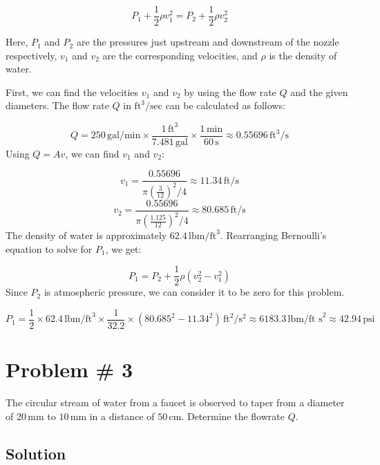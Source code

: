 \documentclass{article}
\begin{document}
\[
P_1 + \frac{1}{2} \rho v_1^2 = P_2 + \frac{1}{2} \rho v_2^2
\]

Here, \(P_1\) and \(P_2\) are the pressures just upstream and downstream of the nozzle respectively, \(v_1\) and \(v_2\) are the corresponding velocities, and \(\rho\) is the density of water.

First, we can find the velocities \(v_1\) and \(v_2\) by using the flow rate \(Q\) and the given diameters. The flow rate \(Q\) in \( \text{ft}^3/\text{sec} \) can be calculated as follows:

\[
Q = 250 \, \text{gal/min} \times \frac{1 \, \text{ft}^3}{7.481 \, \text{gal}} \times \frac{1 \, \text{min}}{60 \, \text{s}} \approx 0.55696 \, \text{ft}^3/\text{s}
\]
\newline
Using \( Q = A v \), we can find \( v_1 \) and \( v_2 \):

\[
v_1 = \frac{0.55696}{\pi ( \frac{3}{12} )^2 / 4} \approx 11.34 \, \text{ft/s}
\]
\[
v_2 = \frac{0.55696}{\pi ( \frac{1.125}{12} )^2 / 4} \approx 80.685 \, \text{ft/s}
\]
\newline
The density of water is approximately \(62.4 \, \text{lbm/ft}^3\).
\newline\newline
Rearranging Bernoulli's equation to solve for \( P_1 \), we get:

\[
P_1 = P_2 + \frac{1}{2} \rho (v_2^2 - v_1^2)
\]
\newline
Since \( P_2 \) is atmospheric pressure, we can consider it to be zero for this problem.

\[
P_1 = \frac{1}{2} \times 62.4 \, \text{lbm/ft}^3 \times \frac{1}{32.2} \times (80.685^2 - 11.34^2) \, \text{ft}^2/\text{s}^2 \approx 6183.3 \, \text{lbm/ft s}^2 \approx 42.94 \, \text{psi}
\]

\newpage
\section*{Problem \# 3}
The circular stream of water from a faucet is observed to taper from a diameter of \(20 \, \text{mm}\) to \(10 \, \text{mm}\) in a distance of \(50 \, \text{cm}\). Determine the flowrate \(Q\).

\subsection*{Solution}
\end{document}
